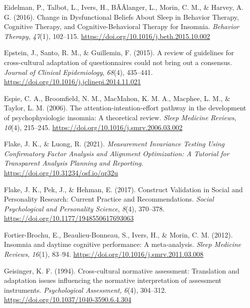 \documentclass[
  ,doc,11pt, twoside,floatsintext]{apa6}
\newlength{\cslhangindent}
\newlength{\cslentryspacingunit} %
\newenvironment{CSLReferences}[2] %
 {%
  \setlength{\parindent}{0pt}
  \ifodd #1
  \let\oldpar\par
  \def\par{\hangindent=\cslhangindent\oldpar}
  \fi
  \setlength{\parskip}{#2\cslentryspacingunit}
 }%
 {}
\begin{document}
\begin{CSLReferences}{1}{0}
\leavevmode{}%
Eidelman, P., Talbot, L., Ivers, H., BÃÂlanger, L., Morin, C. M., \& Harvey, A. G. (2016). Change in {Dysfunctional Beliefs About Sleep} in {Behavior Therapy}, {Cognitive Therapy}, and {Cognitive-Behavioral Therapy} for {Insomnia}. \emph{Behavior Therapy}, \emph{47}(1), 102--115. \url{https://doi.org/10.1016/j.beth.2015.10.002}

\leavevmode{}%
Epstein, J., Santo, R. M., \& Guillemin, F. (2015). A review of guidelines for cross-cultural adaptation of questionnaires could not bring out a consensus. \emph{Journal of Clinical Epidemiology}, \emph{68}(4), 435--441. \url{https://doi.org/10.1016/j.jclinepi.2014.11.021}

\leavevmode{}%
Espie, C. A., Broomfield, N. M., MacMahon, K. M. A., Macphee, L. M., \& Taylor, L. M. (2006). The attention-intention-effort pathway in the development of psychophysiologic insomnia: A theoretical review. \emph{Sleep Medicine Reviews}, \emph{10}(4), 215--245. \url{https://doi.org/10.1016/j.smrv.2006.03.002}

\leavevmode{}%
Flake, J. K., \& Luong, R. (2021). \emph{Measurement {Invariance Testing Using Confirmatory Factor Analysis} and {Alignment Optimization}: {A Tutorial} for {Transparent Analysis Planning} and {Reporting}}. \url{https://doi.org/10.31234/osf.io/qr32u}

\leavevmode{}%
Flake, J. K., Pek, J., \& Hehman, E. (2017). Construct {Validation} in {Social} and {Personality Research}: {Current Practice} and {Recommendations}. \emph{Social Psychological and Personality Science}, \emph{8}(4), 370--378. \url{https://doi.org/10.1177/1948550617693063}

\leavevmode{}%
Fortier-Brochu, E., Beaulieu-Bonneau, S., Ivers, H., \& Morin, C. M. (2012). Insomnia and daytime cognitive performance: A meta-analysis. \emph{Sleep Medicine Reviews}, \emph{16}(1), 83--94. \url{https://doi.org/10.1016/j.smrv.2011.03.008}

\leavevmode{}%
Geisinger, K. F. (1994). Cross-cultural normative assessment: {Translation} and adaptation issues influencing the normative interpretation of assessment instruments. \emph{Psychological Assessment}, \emph{6}(4), 304--312. \url{https://doi.org/10.1037/1040-3590.6.4.304}


\end{CSLReferences}
\end{document}
